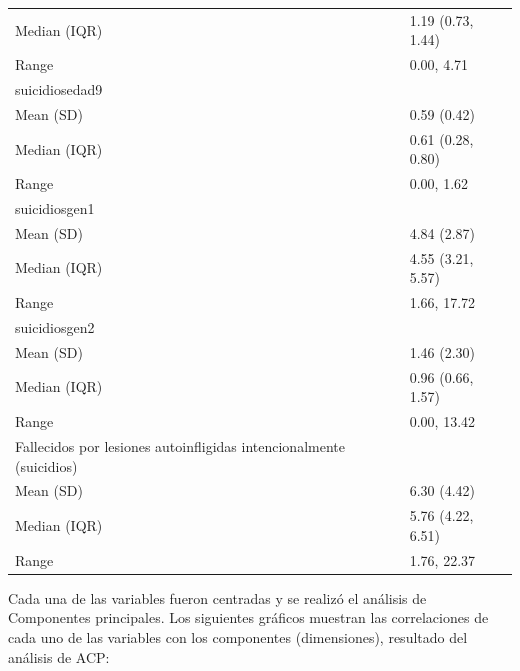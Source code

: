 \begin{table}
\begin{tabular}{ll}
\hspace{1em}Median (IQR) & 1.19 (0.73, 1.44)\\
\hspace{1em}Range & 0.00, 4.71\\
suicidiosedad9 & \\
\hspace{1em}Mean (SD) & 0.59 (0.42)\\
\addlinespace
\hspace{1em}Median (IQR) & 0.61 (0.28, 0.80)\\
\hspace{1em}Range & 0.00, 1.62\\
suicidiosgen1 & \\
\hspace{1em}Mean (SD) & 4.84 (2.87)\\
\hspace{1em}Median (IQR) & 4.55 (3.21, 5.57)\\
\addlinespace
\hspace{1em}Range & 1.66, 17.72\\
suicidiosgen2 & \\
\hspace{1em}Mean (SD) & 1.46 (2.30)\\
\hspace{1em}Median (IQR) & 0.96 (0.66, 1.57)\\
\hspace{1em}Range & 0.00, 13.42\\
\addlinespace
Fallecidos por lesiones autoinfligidas intencionalmente (suicidios) & \\
\hspace{1em}Mean (SD) & 6.30 (4.42)\\
\hspace{1em}Median (IQR) & 5.76 (4.22, 6.51)\\
\hspace{1em}Range & 1.76, 22.37\\
\bottomrule
\end{tabular}
\endgroup{}
\end{table}

Cada una de las variables fueron centradas y se realizó el análisis de
Componentes principales. Los siguientes gráficos muestran las
correlaciones de cada uno de las variables con los componentes
(dimensiones), resultado del análisis de ACP:

